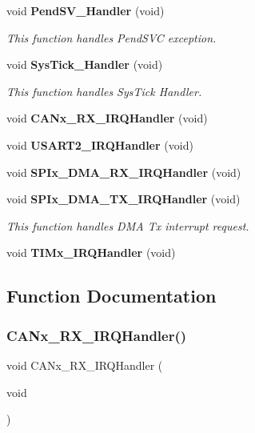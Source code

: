 \begin{DoxyCompactItemize}
void \textbf{ Pend\+S\+V\+\_\+\+Handler} (void)
\begin{DoxyCompactList}\small\item\em This function handles Pend\+S\+VC exception. \end{DoxyCompactList}\item 
void \textbf{ Sys\+Tick\+\_\+\+Handler} (void)
\begin{DoxyCompactList}\small\item\em This function handles Sys\+Tick Handler. \end{DoxyCompactList}\item 
void \textbf{ C\+A\+Nx\+\_\+\+R\+X\+\_\+\+I\+R\+Q\+Handler} (void)
\item 
void \textbf{ U\+S\+A\+R\+T2\+\_\+\+I\+R\+Q\+Handler} (void)
\item 
void \textbf{ S\+P\+Ix\+\_\+\+D\+M\+A\+\_\+\+R\+X\+\_\+\+I\+R\+Q\+Handler} (void)
\item 
void \textbf{ S\+P\+Ix\+\_\+\+D\+M\+A\+\_\+\+T\+X\+\_\+\+I\+R\+Q\+Handler} (void)
\begin{DoxyCompactList}\small\item\em This function handles D\+MA Tx interrupt request. \end{DoxyCompactList}\item 
void \textbf{ T\+I\+Mx\+\_\+\+I\+R\+Q\+Handler} (void)
\end{DoxyCompactItemize}


\subsection{Function Documentation}
\mbox{\label{stm32f3xx__it_8h_a4372ecff238934476bb477119103ec52}} 
\subsubsection{C\+A\+Nx\+\_\+\+R\+X\+\_\+\+I\+R\+Q\+Handler()}
{\footnotesize\ttfamily void C\+A\+Nx\+\_\+\+R\+X\+\_\+\+I\+R\+Q\+Handler (\begin{DoxyParamCaption}\item[{void}]{ }\end{DoxyParamCaption})}

\mbox{\label{stm32f3xx__it_8h_a4bb5295ac2a725af6103888178b4540f}} 

